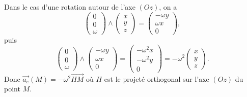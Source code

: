             \begin{example}
                Dans le cas d'une rotation autour de l'axe $(Oz)$, on a 
                \begin{equation*}
                    \begin{pmatrix}
                        0\\0\\\omega
                    \end{pmatrix}\wedge\begin{pmatrix}
                        x\\y\\z
                    \end{pmatrix}=\begin{pmatrix}
                        -\omega y\\\omega x\\0
                    \end{pmatrix},
                \end{equation*}
                puis
                \begin{equation*}
                    \begin{pmatrix}
                        0\\0\\\omega
                    \end{pmatrix}\wedge\begin{pmatrix}
                        -\omega y\\\omega x\\0
                    \end{pmatrix}=\begin{pmatrix}
                        -\omega^{2}x\\-\omega^{2}y\\0
                    \end{pmatrix}=-\omega^{2}\begin{pmatrix}
                        x\\y\\z
                    \end{pmatrix}.
                \end{equation*}
                Donc $\vec{a_e}(M)=-\omega^{2}\vec{HM}$ où $H$ est le projeté orthogonal sur l'axe $(Oz)$ du point $M$.
            \end{example}
